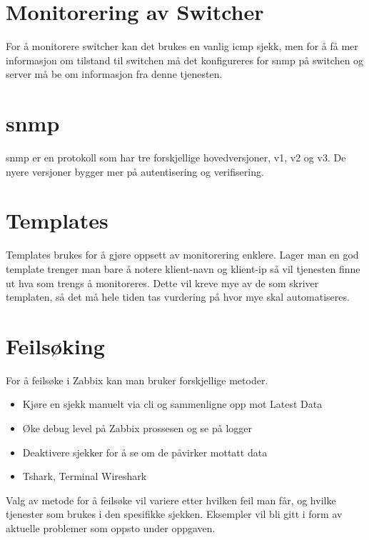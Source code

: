 \section{Monitorering av Switcher}
For å monitorere switcher kan det brukes en vanlig \gls{icmp} sjekk, men for å få mer informasjon om tilstand til switchen må det konfigureres for \gls{snmp} på switchen og server må be om informasjon fra denne tjenesten.



\section{\gls{snmp}}
\gls{snmp} er en protokoll som har tre forskjellige hovedversjoner, v1, v2 og v3. De nyere versjoner bygger mer på autentisering og verifisering.



\section{Templates}
Templates brukes for å gjøre oppsett av monitorering enklere. Lager man en god template trenger man bare å notere klient-navn og klient-ip så vil tjenesten finne ut hva som trengs å monitoreres. Dette vil kreve mye av de som skriver templaten, så det må hele tiden tas vurdering på hvor mye skal automatiseres.

\section{Feilsøking}
For å feilsøke i Zabbix kan man bruker forskjellige metoder.
\begin{itemize}
    \item Kjøre en sjekk manuelt via \gls{cli} og sammenligne opp mot Latest Data
    \item Øke debug level på Zabbix prossesen og se på logger
    \item Deaktivere sjekker for å se om de påvirker mottatt data
    \item Tshark, Terminal Wireshark
\end{itemize}

Valg av metode for å feilsøke vil variere etter hvilken feil man får, og hvilke tjenester som brukes i den spesifikke sjekken.
Eksempler vil bli gitt i form av aktuelle problemer som oppsto under oppgaven.

